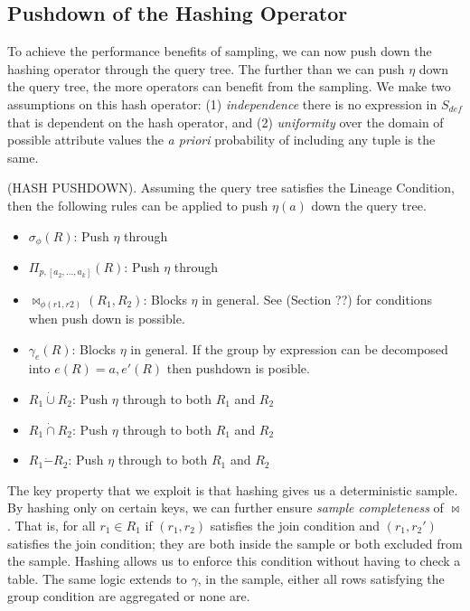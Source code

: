 \subsection{Pushdown of the Hashing Operator}
To achieve the performance benefits of sampling, we can now push down the hashing operator through the query tree.
The further than we can push $\eta$ down the query tree, the more operators can benefit from the sampling.
We make two assumptions on this hash operator: (1) \emph{independence} there is no expression in $S_{def}$ that is dependent on the hash operator, and (2) \emph{uniformity} over the domain of possible attribute values the \emph{a priori} probability of including any tuple is the same.

\begin{proposition}
(HASH PUSHDOWN). Assuming the query tree satisfies the Lineage Condition, then the following rules can be applied to push $\eta(a)$ down the query tree. 
\begin{itemize}\vspace{-.45em}
\item $\sigma_{\phi}(R)$: Push $\eta$ through \vspace{-.45em}
\item $\Pi_{p,[a_2,...,a_k]}(R)$: Push $\eta $ through \vspace{-.45em}
\item $\bowtie_{\phi (r1,r2)}(R_1,R_2)$: Blocks $\eta $ in general. See (Section ??) for conditions when push down is possible.
\item $\gamma_{e}(R)$: Blocks $\eta$ in general. If the group by expression can be decomposed into $e(R) = a, e'(R)$ then pushdown is posible.\vspace{-.45em}
\item $R_1 \dot{\cup} R_2$: Push $\eta $ through to both $R_1$ and $R_2$
\item $R_1 \dot{\cap} R_2$: Push $\eta $ through to both $R_1$ and $R_2$
\item $R_1 \dot{-} R_2$: Push $\eta $ through to both $R_1$ and $R_2$
\end{itemize}
\end{proposition}

The key property that we exploit is that hashing gives us a deterministic sample.
By hashing only on certain keys, we can further ensure \emph{sample completeness} of $\bowtie$.
That is, for all $r_1\in R_1$ if $(r_1,r_2)$ satisfies the join condition and $(r_1,r_2')$ satisfies the join condition; they are both inside the sample or both excluded from the sample. 
Hashing allows us to enforce this condition without having to check a table.
The same logic extends to $\gamma$, in the sample, either all rows satisfying the group condition are aggregated or none are.


